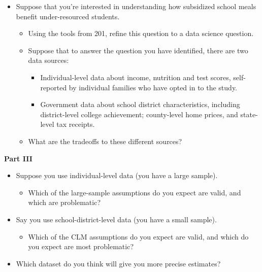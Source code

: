 \documentclass[
]{book}
\providecommand{\tightlist}{%
  \setlength{\itemsep}{0pt}\setlength{\parskip}{0pt}}
\theoremstyle{definition}
\theoremstyle{definition}
\theoremstyle{definition}
\theoremstyle{definition}
\theoremstyle{remark}
\begin{document}
\begin{itemize}
\tightlist
\item
  Suppose that you're interested in understanding how subsidized school meals benefit under-resourced students.

  \begin{itemize}
  \tightlist
  \item
    Using the tools from 201, refine this question to a data science question.
  \item
    Suppose that to answer the question you have identified, there are two data sources:

    \begin{itemize}
    \tightlist
    \item
      Individual-level data about income, nutrition and test scores, self-reported by individual families who have opted in to the study.\\
    \item
      Government data about school district characteristics, including district-level college achievement; county-level home prices, and state-level tax receipts.
    \end{itemize}
  \item
    What are the tradeoffs to these different sources?
  \end{itemize}
\end{itemize}

\textbf{Part III}

\begin{itemize}
\tightlist
\item
  Suppose you use individual-level data (you have a large sample).

  \begin{itemize}
  \tightlist
  \item
    Which of the large-sample assumptions do you expect are valid, and which are problematic?
  \end{itemize}
\item
  Say you use school-district-level data (you have a small sample).

  \begin{itemize}
  \tightlist
  \item
    Which of the CLM assumptions do you expect are valid, and which do you expect are most problematic?
  \end{itemize}
\item
  Which dataset do you think will give you more precise estimates?
\end{itemize}
\end{document}
